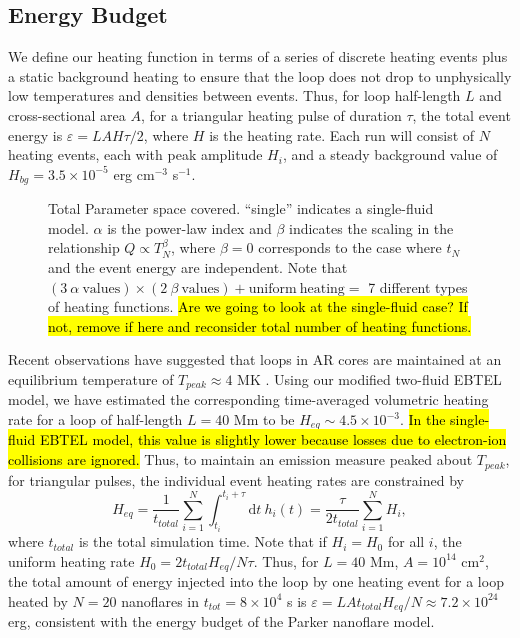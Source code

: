 \documentclass[apj]{emulateapj}
\begin{document}
	\subsection{Energy Budget}
	\label{subsec:params}
	\par We define our heating function in terms of a series of discrete heating events plus a static background heating to ensure that the loop does not drop to unphysically low temperatures and densities between events. Thus, for loop half-length $L$ and cross-sectional area $A$, for a triangular heating pulse of duration $\tau$, the total  event energy is $\varepsilon=LAH\tau/2$, where $H$ is the heating rate. Each run will consist of $N$ heating events, each with peak amplitude $H_i$, and a steady background value of $H_{bg}=3.5\times10^{-5}$ erg cm$^{-3}$ s$^{-1}$.
	\begin{figure}
		\centering
		
		\caption{Total Parameter space covered. ``single'' indicates a single-fluid model. $\alpha$ is the power-law index and $\beta$ indicates the scaling in the relationship $Q\propto T_N^{\beta}$, where $\beta=0$ corresponds to the case where $t_N$ and the event energy are independent. Note that $(3~\alpha~\mathrm{values})\times(2~\beta~\mathrm{values})+\mathrm{uniform~heating}=$ 7 different types of heating functions. \hl{Are we going to look at the single-fluid case? If not, remove if here and reconsider total number of heating functions.}}
		\label{fig:parameter_space}
	\end{figure}
	\par Recent observations have suggested that loops in AR cores are maintained at an equilibrium temperature of $T_{peak}\approx4$ MK \citep{warren_constraints_2011,warren_systematic_2012}. Using our modified two-fluid EBTEL model, we have estimated the corresponding time-averaged volumetric heating rate for a loop of half-length $L=40$ Mm to be  $H_{eq}\sim4.5\times10^{-3}$. \hl{In the single-fluid EBTEL model, this value is slightly lower because losses due to electron-ion collisions are ignored.} Thus, to maintain an emission measure peaked about $T_{peak}$, for triangular pulses, the individual event heating rates are constrained by 
	\begin{equation}
		\label{eq:heating_rate_constraint}
		H_{eq} = \frac{1}{t_{total}}\sum_{i=1}^N\int_{t_i}^{t_i+\tau}\mathrm{d}t~h_i(t) = \frac{\tau}{2t_{total}}\sum_{i=1}^NH_i,
	\end{equation}
	where $t_{total}$ is the total simulation time. Note that if $H_i=H_0$ for all $i$, the uniform heating rate $H_0=2t_{total}H_{eq}/N\tau$. Thus, for $L=40$ Mm, $A=10^{14}$ cm$^2$, the total amount of energy injected into the loop by one heating event for a loop heated by $N=20$ nanoflares in $t_{tot}=8\times10^4$ s is $\varepsilon=LAt_{total}H_{eq}/N\approx7.2\times10^{24}$ erg, consistent with the energy budget of the Parker nanoflare model. 
\end{document}
